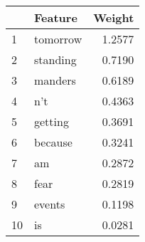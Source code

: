 \begin{tabular}{llr}
\toprule
{} &   Feature &  Weight \\
\midrule
1  &  tomorrow &  1.2577 \\
2  &  standing &  0.7190 \\
3  &   manders &  0.6189 \\
4  &       n't &  0.4363 \\
5  &   getting &  0.3691 \\
6  &   because &  0.3241 \\
7  &        am &  0.2872 \\
8  &      fear &  0.2819 \\
9  &    events &  0.1198 \\
10 &        is &  0.0281 \\
\bottomrule
\end{tabular}
